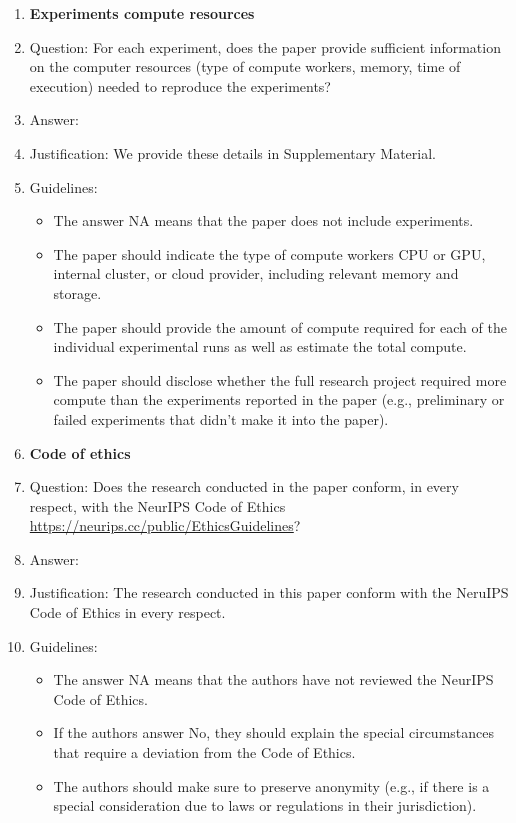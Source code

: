 \documentclass{article}
\begin{document}
\begin{enumerate}
\item {\bf Experiments compute resources}
    \item[] Question: For each experiment, does the paper provide sufficient information on the computer resources (type of compute workers, memory, time of execution) needed to reproduce the experiments?
    \item[] Answer: \answerYes{} %
    \item[] Justification: We provide these details in Supplementary Material.
    \item[] Guidelines:
    \begin{itemize}
        \item The answer NA means that the paper does not include experiments.
        \item The paper should indicate the type of compute workers CPU or GPU, internal cluster, or cloud provider, including relevant memory and storage.
        \item The paper should provide the amount of compute required for each of the individual experimental runs as well as estimate the total compute. 
        \item The paper should disclose whether the full research project required more compute than the experiments reported in the paper (e.g., preliminary or failed experiments that didn't make it into the paper). 
    \end{itemize}
    
\item {\bf Code of ethics}
    \item[] Question: Does the research conducted in the paper conform, in every respect, with the NeurIPS Code of Ethics \url{https://neurips.cc/public/EthicsGuidelines}?
    \item[] Answer: \answerYes{} %
    \item[] Justification: The research conducted in this paper conform with the NeruIPS Code of Ethics in every respect.
    \item[] Guidelines:
    \begin{itemize}
        \item The answer NA means that the authors have not reviewed the NeurIPS Code of Ethics.
        \item If the authors answer No, they should explain the special circumstances that require a deviation from the Code of Ethics.
        \item The authors should make sure to preserve anonymity (e.g., if there is a special consideration due to laws or regulations in their jurisdiction).
    \end{itemize}



\end{enumerate}
\end{document}
